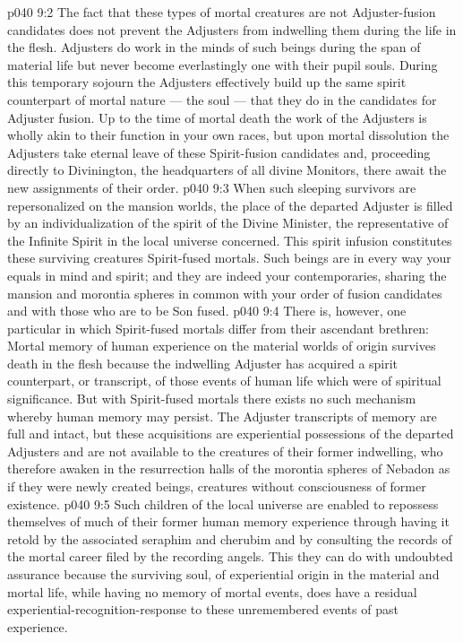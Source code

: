 \vs p040 9:2 \pc The fact that these types of mortal creatures are not Adjuster\hyp{}fusion candidates does not prevent the Adjusters from indwelling them during the life in the flesh. Adjusters do work in the minds of such beings during the span of material life but never become everlastingly one with their pupil souls. During this temporary sojourn the Adjusters effectively build up the same spirit counterpart of mortal nature --- the soul --- that they do in the candidates for Adjuster fusion. Up to the time of mortal death the work of the Adjusters is wholly akin to their function in your own races, but upon mortal dissolution the Adjusters take eternal leave of these Spirit\hyp{}fusion candidates and, proceeding directly to Divinington, the headquarters of all divine Monitors, there await the new assignments of their order.
\vs p040 9:3 When such sleeping survivors are repersonalized on the mansion worlds, the place of the departed Adjuster is filled by an individualization of the spirit of the Divine Minister, the representative of the Infinite Spirit in the local universe concerned. This spirit infusion constitutes these surviving creatures Spirit\hyp{}fused mortals. Such beings are in every way your equals in mind and spirit; and they are indeed your contemporaries, sharing the mansion and morontia spheres in common with your order of fusion candidates and with those who are to be Son fused.
\vs p040 9:4 \pc There is, however, one particular in which Spirit\hyp{}fused mortals differ from their ascendant brethren: Mortal memory of human experience on the material worlds of origin survives death in the flesh because the indwelling Adjuster has acquired a spirit counterpart, or transcript, of those events of human life which were of spiritual significance. But with Spirit\hyp{}fused mortals there exists no such mechanism whereby human memory may persist. The Adjuster transcripts of memory are full and intact, but these acquisitions are experiential possessions of the departed Adjusters and are not available to the creatures of their former indwelling, who therefore awaken in the resurrection halls of the morontia spheres of Nebadon as if they were newly created beings, creatures without consciousness of former existence.
\vs p040 9:5 Such children of the local universe are enabled to repossess themselves of much of their former human memory experience through having it retold by the associated seraphim and cherubim and by consulting the records of the mortal career filed by the recording angels. This they can do with undoubted assurance because the surviving soul, of experiential origin in the material and mortal life, while having no memory of mortal events, does have a residual experiential\hyp{}recognition\hyp{}response to these unremembered events of past experience.
